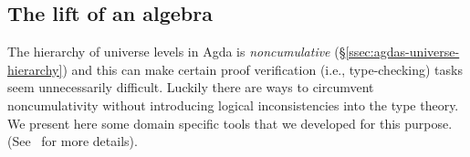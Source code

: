 \documentclass[a4paper,UKenglish,cleveref,autoref,thm-restate]{lipics-v2021}
\begin{document}
\subsection{The lift of an algebra}\label{ssec:the-lift-of-an-algebra}
The hierarchy of universe levels in Agda is \emph{noncumulative} (\S\ref{ssec:agdas-universe-hierarchy}) and this can make certain proof verification (i.e., type-checking) tasks seem unnecessarily difficult. Luckily there are ways to circumvent noncumulativity without introducing logical inconsistencies into the type theory. We present here some domain specific tools that we developed for this purpose. (See~\cite[\S3.3]{DeMeo:2021} for more details).
\end{document}
